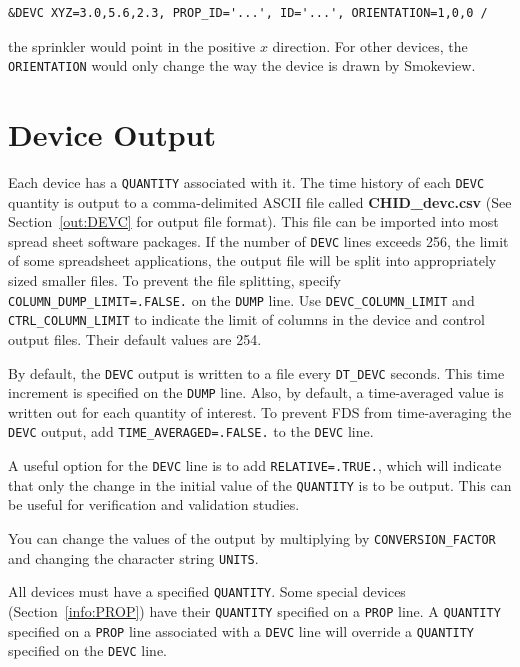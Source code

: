 \documentclass[11pt]{book}
\newcommand{\ct}{\tt\small}
\begin{document}
\footnotesize
\begin{verbatim}
&DEVC XYZ=3.0,5.6,2.3, PROP_ID='...', ID='...', ORIENTATION=1,0,0 /
\end{verbatim}
\normalsize

\noindent
the sprinkler would point in the positive $x$ direction.
For other devices, the {\ct ORIENTATION} would only change the way the device is drawn by Smokeview.



\section{Device Output}
\label{info:out:DEVC}

Each device has a {\ct QUANTITY} associated with it.
The time history of each {\ct DEVC} quantity is output to a comma-delimited
ASCII file called {\bf CHID\_devc.csv}
(See Section~\ref{out:DEVC} for output file format).
This file can be imported into most spread sheet software packages.
If the number of {\ct DEVC} lines exceeds 256, the limit of some spreadsheet
applications, the output file will be split into appropriately sized smaller
files. To prevent the file splitting, specify {\ct COLUMN\_DUMP\_LIMIT=.FALSE.} on the {\ct DUMP} line.
Use {\ct DEVC\_COLUMN\_LIMIT} and {\ct CTRL\_COLUMN\_LIMIT} to indicate the limit of columns in the
device and control output files. Their default values are 254.

By default, the {\ct DEVC} output is written to a file every {\ct DT\_DEVC} seconds.
This time increment is specified on the {\ct DUMP} line. Also, by default,
a time-averaged value is written out for each quantity of interest. To prevent FDS from time-averaging the {\ct DEVC} output, add
{\ct TIME\_AVERAGED=.FALSE.} to the {\ct DEVC} line.

A useful option for the {\ct DEVC} line is to add {\ct RELATIVE=.TRUE.}, which will indicate that only the change in
the initial value of the {\ct QUANTITY} is to be output. This can be useful for verification and validation studies.

You can change the values of the output by multiplying by {\ct CONVERSION\_FACTOR} and changing the character string {\ct UNITS}.


\begin{warning}
All devices must have a specified {\ct QUANTITY}.  Some special devices (Section~\ref{info:PROP}) have their {\ct QUANTITY}
specified on a {\ct PROP} line.
A {\ct QUANTITY} specified on a {\ct PROP} line associated with a {\ct DEVC} line will override a {\ct QUANTITY}
specified on the {\ct DEVC} line.
\end{warning}
\end{document}
